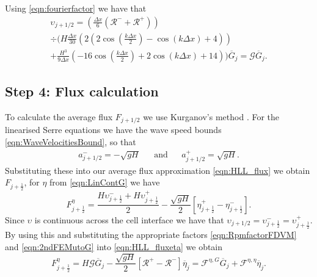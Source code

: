 Using \eqref{eqn:fourierfactor} we have that
\begin{multline}
\label{eqn:2ndFEMutoG}
\upsilon_{j+1/2} =  \left(\frac{\Delta x}{6} \left(\mathcal{R}^- + \mathcal{R}^+ \right)\right) \\ \div  \Bigg(H\frac{\Delta x}{30} \left( 2\left(2\cos\left(\frac{k \Delta x}{2}\right) - \cos\left({k \Delta x}\right) + 4\right)  \right)  \\+ \frac{H^3 }{9\Delta x}\left(-16\cos\left(\frac{k\Delta x}{2}\right) + 2 \cos\left(k \Delta x\right) + 14\right)    \Bigg) \overline{G}_{j}= \mathcal{G} \overline{G}_{j}.
\end{multline}
 

\subsection{Step 4: Flux calculation}
To calculate the average flux $F_{j+1/2}$ we use Kurganov's method \cite{Kurganov-etal-2001-707}. For the linearised Serre equations we have the wave speed bounds \eqref{eqn:WaveVelocitiesBound}, so that
\begin{align}
a^-_{j+ 1/2} =  - \sqrt{g H}& &\text{and}& &a^+_{j+ 1/2} = \sqrt{g H}.
\end{align}
 Substituting these into our average flux approximation \eqref{eqn:HLL_flux} we obtain $F_{j+\frac{1}{2}}$, for $\eta$ from \eqref{eqn:LinContG} we have
\begin{equation}
\label{eqn:HLL_fluxeta}
F^{\eta}_{j+\frac{1}{2}} = \dfrac{ H \upsilon ^-_{j+\frac{1}{2}}+ H \upsilon ^+_{j+\frac{1}{2}}}{ 2}  - \dfrac{ \sqrt{gH}}{ 2} \left [ \eta^+_{j+\frac{1}{2}} - \eta^-_{j+\frac{1}{2}} \right ].
\end{equation}
Since $\upsilon$ is continuous across the cell interface we have that $\upsilon_{j+1/2} = \upsilon ^-_{j+\frac{1}{2}} = \upsilon ^+_{j+\frac{1}{2}}$. By using this and substituting the appropriate factors \eqref{eqn:RpmfactorFDVM} and \eqref{eqn:2ndFEMutoG} into \eqref{eqn:HLL_fluxeta} we obtain
\begin{equation}
\label{eqn:etafluxapprox}
F^{\eta}_{j+\frac{1}{2}} = H \mathcal{G} \overline{G}_{j}   - \dfrac{ \sqrt{gH}}{ 2} \left [  \mathcal{R}^+ -  \mathcal{R}^- \right ] \overline{\eta}_{j}  = \mathcal{F}^{\eta,G} \overline{G}_{j}   +  \mathcal{F}^{\eta,\eta} \overline{\eta}_{j}.
\end{equation}

